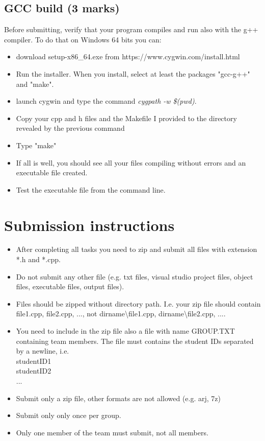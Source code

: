 \documentclass[10pt]{article}
\begin{document}
\subsection{GCC build (3 marks)}
Before submitting, verify that your program compiles and run also with the g++ compiler. To do that on Windows 64 bits you can:
\begin{itemize}
    \item download setup-x86\_64.exe from https://www.cygwin.com/install.html
    \item Run the installer. When you install, select at least the packages "gcc-g++" and "make".
    \item launch cygwin and type the command \textit{cygpath -w \$(pwd)}.  
    \item Copy your cpp and h files and the Makefile I provided to the directory revealed by the previous command
    \item Type "make"
    \item If all is well, you should see all your files compiling without errors and an executable file created. 
    \item Test the executable file from the command line.
\end{itemize}

\section{Submission instructions}
\label{sec:submission}
\begin{itemize}
    \item After completing all tasks you need to zip and submit all files with extension *.h and *.cpp.
    \item Do not submit any other file (e.g. txt files, visual studio project files, object files, executable files, output files).
    \item Files should be zipped without directory path.  I.e. your zip file should contain file1.cpp, file2.cpp, ..., not dirname\textbackslash file1.cpp, dirname\textbackslash file2.cpp, ....
    \item You need to include in the zip file also a file with name GROUP.TXT containing team members. The file must contains the student IDs separated by a newline, i.e.
    \\ \indent studentID1
    \\ \indent  studentID2
    \\ \indent  ...
    \item Submit only a zip file, other formats are not allowed (e.g. arj, 7z)
    \item Submit only only once per group.
    \item Only one member of the team must submit, not all members.
\end{itemize}
  
\end{document}
